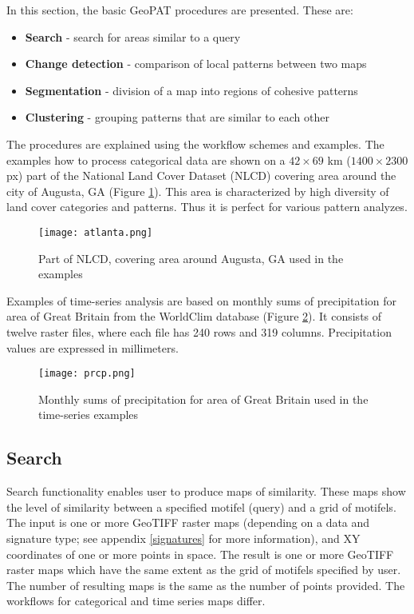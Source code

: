In this section, the basic GeoPAT procedures are presented. These are: 

\begin{itemize}
	\item {\bf Search} - search for areas similar to a query
	\item {\bf Change detection} - comparison of local patterns between two maps
	\item {\bf Segmentation} - division of a map into regions of cohesive patterns
	\item {\bf Clustering} - grouping patterns that are similar to each other
\end{itemize}

The procedures are explained using the workflow schemes and examples.
The examples how to process categorical data are shown on a $42\times 69$ km ($1400\times 2300$ px) part of the National Land Cover Dataset (NLCD) covering area around the city of Augusta, GA (Figure \ref{FIG:AUGUSTA}).
This area is characterized by high diversity of land cover categories and patterns.
Thus it is perfect for various pattern analyzes.

\begin{figure}[H]
	\centering
	\texttt{[image: atlanta.png]}
	\caption{Part of NLCD, covering area around Augusta, GA used in the examples}
	\label{FIG:AUGUSTA}
\end{figure}

Examples of time-series analysis are based on monthly sums of precipitation for area of Great Britain from the WorldClim database (Figure \ref{FIG:PRCP}).
It consists of twelve raster files, where each file has 240 rows and 319 columns.
Precipitation values are expressed in millimeters.

\begin{figure}[H]
	\centering
	\texttt{[image: prcp.png]}
	\caption{Monthly sums of precipitation for area of Great Britain used in the time-series examples}
	\label{FIG:PRCP}
\end{figure}

\FloatBarrier

\subsection{Search}

Search functionality enables user to produce maps of similarity. 
These maps show the level of similarity between a specified motifel (query) and a grid of motifels.
The input is one or more GeoTIFF raster maps (depending on a data and signature type; see appendix \ref{signatures} for more information), and XY coordinates of one or more points in space.
The result is one or more GeoTIFF raster maps which have the same extent as the grid of motifels specified by user.
The number of resulting maps is the same as the number of points provided.
The workflows for categorical and time series maps differ.

